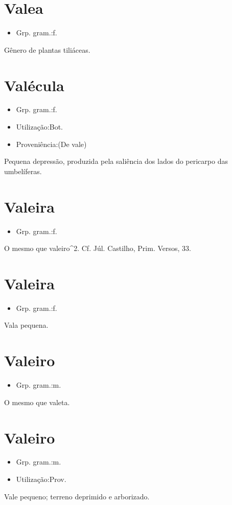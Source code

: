 \documentclass{article}
\begin{document}
\section{Valea}
\begin{itemize}
\item {Grp. gram.:f.}
\end{itemize}
Gênero de plantas tiliáceas.
\section{Valécula}
\begin{itemize}
\item {Grp. gram.:f.}
\end{itemize}
\begin{itemize}
\item {Utilização:Bot.}
\end{itemize}
\begin{itemize}
\item {Proveniência:(De \textunderscore vale\textunderscore )}
\end{itemize}
Pequena depressão, produzida pela saliência dos lados do pericarpo das umbelíferas.
\section{Valeira}
\begin{itemize}
\item {Grp. gram.:f.}
\end{itemize}
O mesmo que \textunderscore valeiro\textunderscore ^2. Cf. Júl. Castilho, \textunderscore Prim. Versos\textunderscore , 33.
\section{Valeira}
\begin{itemize}
\item {Grp. gram.:f.}
\end{itemize}
Vala pequena.
\section{Valeiro}
\begin{itemize}
\item {Grp. gram.:m.}
\end{itemize}
O mesmo que \textunderscore valeta\textunderscore .
\section{Valeiro}
\begin{itemize}
\item {Grp. gram.:m.}
\end{itemize}
\begin{itemize}
\item {Utilização:Prov.}
\end{itemize}
Vale pequeno; terreno deprimido e arborizado.
\end{document}
